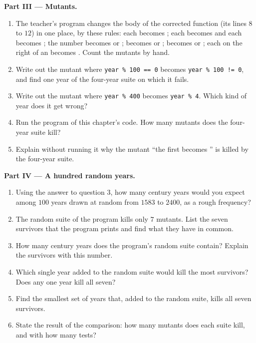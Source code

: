 \begin{problem}
\medskip\noindent\textbf{Part III --- Mutants.}
\begin{enumerate}[resume]
  \item The teacher's program changes the body of the corrected function (its lines $8$ to $12$) in one place, by
    these rules: each \code{==} becomes \code{!=}; each  becomes  and each  becomes
    ; the number  becomes  or ;  becomes  or ;
     becomes  or ; each  on the right of an \code{==} becomes . Count
    the mutants by hand.
  \item Write out the mutant where \texttt{year \% 100 == 0} becomes \texttt{year \% 100 != 0}, and find one year of the
    four-year suite on which it fails.
  \item Write out the mutant where \texttt{year \% 400} becomes \texttt{year \% 4}. Which kind of year does it get wrong?
  \item Run the program  of this chapter's code. How many mutants does the four-year suite
    kill?
  \item Explain without running it why the mutant ``the first  becomes '' is killed by the
    four-year suite.
\end{enumerate}

\medskip\noindent\textbf{Part IV --- A hundred random years.}
\begin{enumerate}[resume]
  \item Using the answer to question 3, how many century years would you expect among $100$ years drawn at random
    from $1583$ to $2400$, as a rough frequency?
  \item The random suite of the program kills only $7$ mutants. List the seven survivors that the program prints and
    find what they have in common.
  \item How many century years does the program's random suite contain? Explain the survivors with this number.
  \item Which single year added to the random suite would kill the most survivors? Does any one year kill all seven?
  \item Find the smallest set of years that, added to the random suite, kills all seven survivors.
  \item State the result of the comparison: how many mutants does each suite kill, and with how many tests?
\end{enumerate}
\end{problem}

